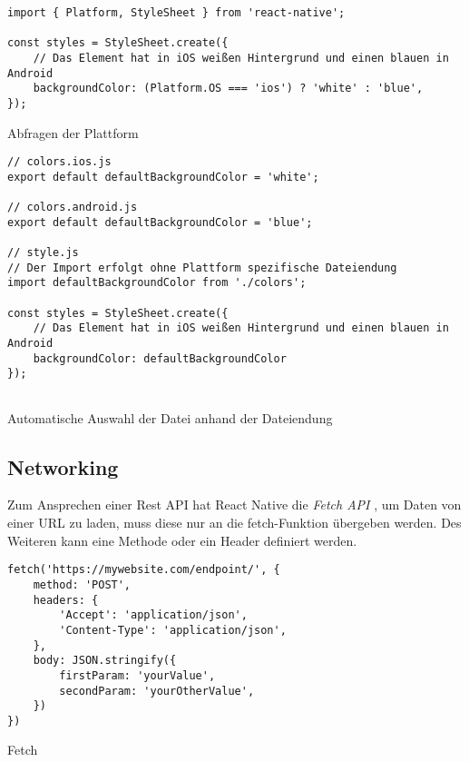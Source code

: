 \begin{listing}[H]
    \begin{verbatim}
import { Platform, StyleSheet } from 'react-native';

const styles = StyleSheet.create({
    // Das Element hat in iOS weißen Hintergrund und einen blauen in Android
    backgroundColor: (Platform.OS === 'ios') ? 'white' : 'blue',
});
    \end{verbatim}
    \caption{Abfragen der Plattform}
    \label{lst:platform_os}
\end{listing}

\begin{listing}[H]
    \begin{verbatim}
// colors.ios.js
export default defaultBackgroundColor = 'white';

// colors.android.js
export default defaultBackgroundColor = 'blue';
 
// style.js
// Der Import erfolgt ohne Plattform spezifische Dateiendung
import defaultBackgroundColor from './colors';
 
const styles = StyleSheet.create({
    // Das Element hat in iOS weißen Hintergrund und einen blauen in Android
    backgroundColor: defaultBackgroundColor
});
     
    \end{verbatim}
    \caption{Automatische Auswahl der Datei anhand der Dateiendung}
    \label{lst:platform_file}
\end{listing}

\subsection{Networking}
Zum Ansprechen einer Rest API hat React Native die \textit{Fetch API} \cite{facebook_inc._fetch_2017}, um Daten von einer URL zu laden, muss diese nur an die fetch-Funktion übergeben werden. Des Weiteren kann eine Methode oder ein Header definiert werden. 


\begin{listing}[H]
    \begin{verbatim}
fetch('https://mywebsite.com/endpoint/', {
    method: 'POST',
    headers: {
        'Accept': 'application/json',
        'Content-Type': 'application/json',
    },
    body: JSON.stringify({
        firstParam: 'yourValue',
        secondParam: 'yourOtherValue',
    })
})
    \end{verbatim}
    \caption{Fetch \cite{facebook_inc._fetch_2017}}
    \label{lst:fetch}
\end{listing}


